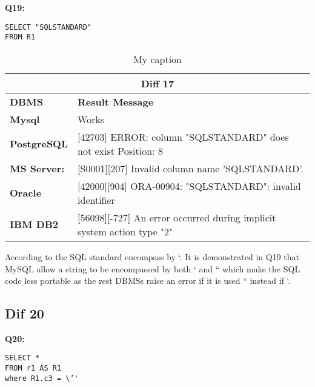 \begin{mdframed}[backgroundcolor=lightgray!20] 
\textbf{Q19:}
\begin{lstlisting}
SELECT "SQLSTANDARD"
FROM R1
\end{lstlisting}
\end{mdframed} 

 
\begin{table}[h]
\centering
\caption{My caption}
\label{my-label}
\begin{tabular}{|p{2cm}|p{12cm}|}
\hline
\multicolumn{2}{|c|}{\textbf{Diff 17}}                                                                                                 \\ \hline
\textbf{DBMS}                              & \textbf{Result Message}                                                                   \\ \hline
{\color[HTML]{333333} \textbf{Mysql}}      & {\color[HTML]{333333} Works}                                                              \\ \hline
{\color[HTML]{333333} \textbf{PostgreSQL}} & {\color[HTML]{333333} {[}42703{]} ERROR: column "SQLSTANDARD" does not exist Position: 8} \\ \hline
{\color[HTML]{333333} \textbf{MS Server:}} & {\color[HTML]{333333} {[}S0001{]}{[}207{]} Invalid column name 'SQLSTANDARD'.}            \\ \hline
\textbf{Oracle}                            & {[}42000{]}{[}904{]} ORA-00904: "SQLSTANDARD": invalid identifier                         \\ \hline
\textbf{IBM DB2}                           & {[}56098{]}{[}-727{]} An error occurred during implicit system action type "2"            \\ \hline
\end{tabular}
\end{table}

According to the SQL standard encompass by ‘. It is demonstrated in Q19 that MySQL allow a string to be encompassed by both ‘ and “ which make the SQL code less portable as the rest DBMSs raise an error if it is used “ instead if ‘. 


\subsection{Dif 20}

\begin{mdframed}[backgroundcolor=lightgray!20] 
\textbf{Q20:}
\begin{lstlisting}
SELECT *
FROM r1 AS R1
where R1.c3 = \’'
\end{lstlisting}
\end{mdframed} 

